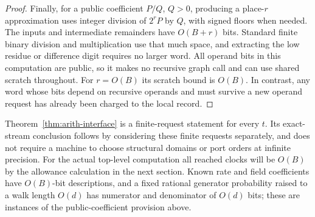 \begin{proof}
Finally, for a public coefficient $P/Q$, $Q>0$, producing a
place-$r$ approximation uses integer division of $2^rP$ by $Q$,
with signed floors when needed.  The inputs and intermediate
remainders have $O(B+r)$ bits.  Standard finite binary division
and multiplication use that much space, and extracting the
low residue or difference digit requires no larger word.
All operand bits in this computation are public, so it makes no
recursive graph call and can use shared scratch throughout.
For $r=O(B)$ its scratch bound is $O(B)$.  In contrast, any word
whose bits depend on recursive operands and must survive a new
operand request has already been charged to the local record.
\end{proof}

\begin{remark}
\label{rem:arith-clocks}
Theorem~\ref{thm:arith-interface} is a finite-request statement
for every $t$.  Its exact-stream conclusion follows by considering
these finite requests separately, and does not require a machine
to choose structural domains or port orders at infinite precision.
For the actual top-level computation all reached clocks will be
$O(B)$ by the allowance calculation in the next section.  Known
rate and field coefficients have $O(B)$-bit descriptions, and a
fixed rational generator probability raised to a walk length
$O(d)$ has numerator and denominator of $O(d)$ bits; these are
instances of the public-coefficient provision above.
\end{remark}
